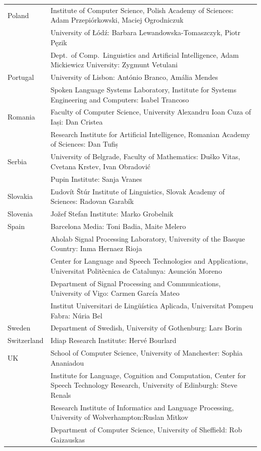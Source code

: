 \begin{longtable}{@{}lp{137mm}@{}}
Poland & Institute of Computer Science, Polish Academy of Sciences: Adam Przepiórkowski, Maciej Ogrodniczuk \\ \addlinespace
& University of Łódź: Barbara Lewandowska-Tomaszczyk, Piotr Pęzik\\ \addlinespace
& Dept.~of Comp.~Linguistics and Artificial Intelligence, Adam Mickiewicz University: Zygmunt Vetulani \\ \addlinespace
Portugal & University of Lisbon: António Branco, Amália Mendes \\ \addlinespace 
& Spoken Language Systems Laboratory, Institute for Systems Engineering and Computers: Isabel Trancoso \\ \addlinespace
Romania & Faculty of Computer Science, University Alexandru Ioan Cuza of Iași: Dan Cristea \\ \addlinespace
& Research Institute for Artificial Intelligence, Romanian Academy of Sciences:  Dan Tufiș \\ \addlinespace
Serbia  & University of Belgrade, Faculty of Mathematics: Duško Vitas, Cvetana Krstev,  Ivan Obradović \\ \addlinespace
& Pupin Institute: Sanja Vranes \\ \addlinespace  
Slovakia & Ľudovít Štúr Institute of Linguistics, Slovak Academy of Sciences: Radovan Garabík \\ \addlinespace 
Slovenia & Jožef Stefan Institute: Marko Grobelnik \\ \addlinespace 
Spain & Barcelona Media: Toni Badia, Maite Melero \\ \addlinespace  
& Aholab Signal Processing Laboratory, University of the Basque Country:  Inma Hernaez Rioja \\ \addlinespace 
& Center for Language and Speech Technologies and Applications, Universitat Politècnica de Catalunya:  Asunción Moreno \\ \addlinespace 
& Department of Signal Processing and Communications, University of Vigo:  Carmen García Mateo \\ \addlinespace 
& Institut Universitari de Lingüística Aplicada, Universitat Pompeu Fabra: Núria Bel \\ \addlinespace 
Sweden & Department of Swedish, University of Gothenburg: Lars Borin \\ \addlinespace 
Switzerland & Idiap Research Institute: Hervé Bourlard \\ \addlinespace 
UK & School of Computer Science, University of Manchester: Sophia Ananiadou \\ \addlinespace  & Institute for Language, Cognition and Computation, Center for Speech Technology Research, University of Edinburgh: Steve Renals \\ \addlinespace 
& Research Institute of Informatics and Language Processing, University of Wolverhampton:\newline Ruslan Mitkov \\ \addlinespace
& Department of Computer Science, University of Sheffield: Rob Gaizauskas\\ 
\end{longtable}
\normalsize

